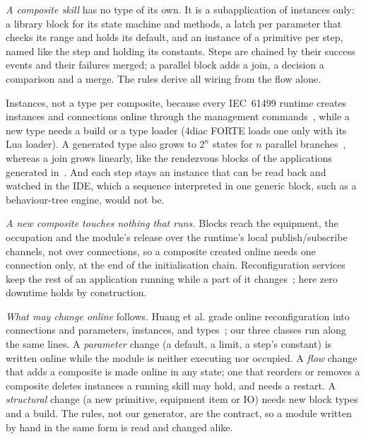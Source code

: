 \emph{A composite skill} has no type of its own. It is a subapplication of instances only: a library
block for its state machine and methods, a latch per parameter that checks its range and holds its
default, and an instance of a primitive per step, named like the step and holding its constants. Steps
are chained by their success events and their failures merged; a parallel block adds a join, a
decision a comparison and a merge. The rules derive all wiring from the flow alone.

Instances, not a type per composite, because every IEC~61499 runtime creates instances and connections
online through the management commands~\cite{iec61499}, while a new type needs a build or a type
loader (4diac FORTE loads one only with its Lua loader). A generated type also grows to $2^n$ states for
$n$ parallel branches~\cite{dorofeev2021orchestrator}, whereas a join grows linearly, like the
rendezvous blocks of the applications generated in~\cite{terzimehic2021service}. And each step stays an
instance that can be read back and watched in the IDE, which a sequence interpreted in one generic
block, such as a behaviour-tree engine, would not be.

\emph{A new composite touches nothing that runs.} Blocks reach the equipment, the occupation and the
module's release over the runtime's local publish/subscribe channels, not over connections, so a
composite created online needs one connection only, at the end of the initialisation chain.
Reconfiguration services keep the rest of an application running while a part of it
changes~\cite{rooker2007zero}; here zero downtime holds by construction.

\emph{What may change online} follows. Huang et al. grade online reconfiguration into connections and
parameters, instances, and types~\cite{huang2026plug}; our three classes run along the same lines. A
\emph{parameter} change (a default, a limit, a step's constant) is written online while the module is
neither executing nor occupied. A \emph{flow} change that adds a composite is made online in any state;
one that reorders or removes a composite deletes instances a running skill may hold, and needs a
restart. A \emph{structural} change (a new primitive, equipment item or IO) needs new block types and a
build. The rules, not our generator, are the contract, so a module written by hand in the same form is
read and changed alike.


